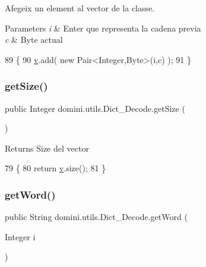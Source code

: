 Afegeix un element al vector de la classe. 


\begin{DoxyParams}{Parameters}
{\em i} & Enter que representa la cadena previa \\
\hline
{\em c} & Byte actual \\
\hline
\end{DoxyParams}

\begin{DoxyCode}
89                                        \{
90         \hyperlink{classdomini_1_1utils_1_1Dict__Decode_a351bb8836b391e5e21ebc9cc1943a22d}{v}.add( \textcolor{keyword}{new} Pair<Integer,Byte>(i,c) );
91     \}
\end{DoxyCode}
\mbox{\label{classdomini_1_1utils_1_1Dict__Decode_aac69020c3515649e8c2d70e2908e3f3e}} 
\subsubsection{\texorpdfstring{get\+Size()}{getSize()}}
{\footnotesize\ttfamily public Integer domini.\+utils.\+Dict\+\_\+\+Decode.\+get\+Size (\begin{DoxyParamCaption}{ }\end{DoxyParamCaption})\hspace{0.3cm}{\ttfamily [inline]}}

\begin{DoxyReturn}{Returns}
Size del vector 
\end{DoxyReturn}

\begin{DoxyCode}
79                              \{
80         \textcolor{keywordflow}{return} \hyperlink{classdomini_1_1utils_1_1Dict__Decode_a351bb8836b391e5e21ebc9cc1943a22d}{v}.size();
81     \}
\end{DoxyCode}
\mbox{\label{classdomini_1_1utils_1_1Dict__Decode_a0f6457460aefe9df50f0cad48f58feee}} 
\subsubsection{\texorpdfstring{get\+Word()}{getWord()}}
{\footnotesize\ttfamily public String domini.\+utils.\+Dict\+\_\+\+Decode.\+get\+Word (\begin{DoxyParamCaption}\item[{Integer}]{i }\end{DoxyParamCaption})\hspace{0.3cm}{\ttfamily [inline]}}



